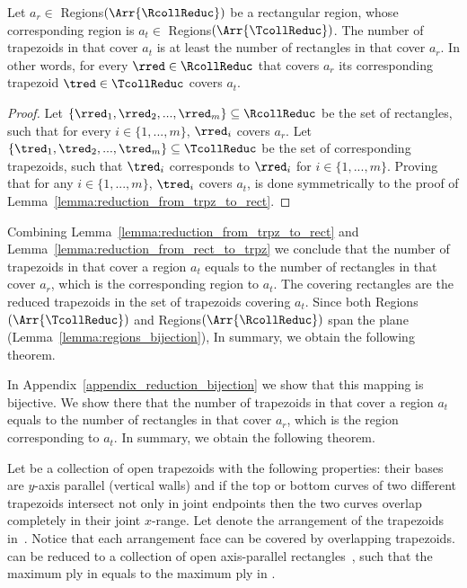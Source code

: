 {\begin{lemma}
\label{lemma:reduction_from_rect_to_trpz}
Let $a_r\in$ Regions$(\Arr{\RcollReduc})$ be a rectangular region,
whose corresponding region is $a_t \in$ Regions$(\Arr{\TcollReduc})$.
The number of trapezoids in \TcollReduc that cover $a_t$
is at least the number of rectangles in \RcollReduc that cover $a_r$.
In other words,
for every $\rred \in \RcollReduc$ that covers $a_r$
its corresponding trapezoid $\tred \in \TcollReduc$ covers $a_t$.
\end{lemma}

\begin{proof}
Let $\{\rred_1,\rred_2,...,\rred_m\}\subseteq \RcollReduc$
be the set of rectangles,
such that for every $i\in\{1,...,m\}$, $\rred_i$ covers $a_r$.
Let $\{\tred_1,\tred_2,...,\tred_m\}\subseteq \TcollReduc$
be the set of corresponding
trapezoids, such that $\tred_i$ corresponds to $\rred_i$ for
$i \in \{1,...,m\}$.
Proving that for any $i \in \{1,...,m\}$, $\tred_i$ covers $a_t$,
is done symmetrically to the proof of Lemma~\ref{lemma:reduction_from_trpz_to_rect}.
\myqed
\end{proof}

Combining Lemma~\ref{lemma:reduction_from_trpz_to_rect} and
Lemma~\ref{lemma:reduction_from_rect_to_trpz}
we conclude that the number of trapezoids in \TcollReduc
that cover a region $a_t$ equals to the number
of rectangles in \RcollReduc that cover $a_r$, which is
the corresponding region to $a_t$.
The covering rectangles are the reduced trapezoids
in the set of trapezoids covering $a_t$.
Since both Regions$(\Arr{\TcollReduc})$
and Regions$(\Arr{\RcollReduc})$ span the plane
(Lemma~\ref{lemma:regions_bijection}),
In summary, we obtain the following theorem.
}
{
In Appendix~\ref{appendix_reduction_bijection} we show that this mapping is bijective.
We show there that the number of trapezoids in \TcollReduc
that cover a region $a_t$ equals to the number
of rectangles in \RcollReduc that cover $a_r$, which is
the region corresponding to $a_t$.
In summary, we obtain the following theorem.
}

\begin{theorem}
\label{theorem:reduction_correctness}
Let \TcollReduc be a collection of
open trapezoids with the following properties:
their bases are $y$-axis parallel (vertical walls) and if
the top or bottom curves of two different trapezoids intersect
not only in joint endpoints
then the two curves overlap completely in their joint $x$-range.
Let \Arr{\TcollReduc} denote the arrangement
of the trapezoids in~\TcollReduc. Notice
that each arrangement face can be covered by
overlapping trapezoids.
\TcollReduc can be reduced to a collection of open
axis-parallel rectangles~\RcollReduc,
such that the maximum ply in \Arr{\RcollReduc} equals
to the maximum ply in \Arr{\TcollReduc}.
\end{theorem}


